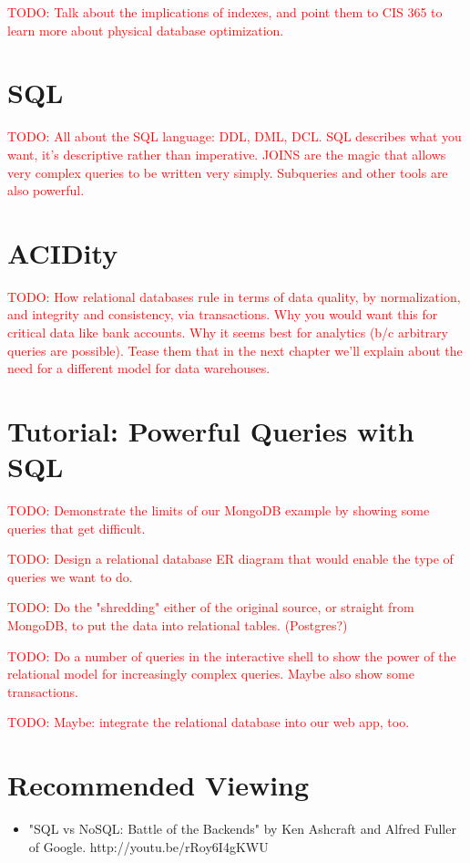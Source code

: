 \documentclass[11pt]{book}
\newcommand{\todo}[1]{\textcolor{red}{TODO: #1}} %
\begin{document}
\todo{Talk about the implications of indexes, and point them to CIS 365 to learn more about physical database optimization.}




\section{SQL}
\todo{All about the SQL language: DDL, DML, DCL.  SQL describes what you want, it's descriptive rather than imperative.  JOINS are the magic that allows very complex queries to be written very simply.  Subqueries and other tools are also powerful.}

\section{ACIDity}
\todo{How relational databases rule in terms of data quality, by normalization, and integrity and consistency, via transactions.  Why you would want this for critical data like bank accounts.  Why it seems best for analytics (b/c arbitrary queries are possible).  Tease them that in the next chapter we'll explain about the need for a different model for data warehouses.}

\section{Tutorial: Powerful Queries with SQL}

\todo{Demonstrate the limits of our MongoDB example by showing some queries that get difficult.}

\todo{Design a relational database ER diagram that would enable the type of queries we want to do.}

\todo{Do the "shredding" either of the original source, or straight from MongoDB, to put the data into relational tables. (Postgres?)}

\todo{Do a number of queries in the interactive shell to show the power of the relational model for increasingly complex queries.  Maybe also show some transactions.}

\todo{Maybe: integrate the relational database into our web app, too.}

\section*{Recommended Viewing}
\begin{itemize}
    \item "SQL vs NoSQL: Battle of the Backends" by Ken Ashcraft and Alfred Fuller of Google.  http://youtu.be/rRoy6I4gKWU
\end{itemize}
\end{document}
